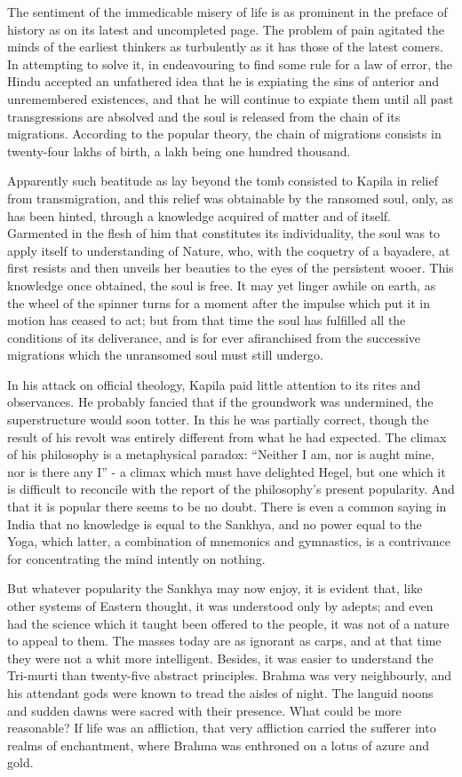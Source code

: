 \documentclass[]{book}
\begin{document}
The sentiment of the immedicable misery of life is as prominent in the
preface of history as on its latest and uncompleted page. The problem of
pain agitated the minds of the earliest thinkers as turbulently as it
has those of the latest comers. In attempting to solve it, in
endeavouring to find some rule for a law of error, the Hindu accepted an
unfathered idea that he is expiating the sins of anterior and
unremembered existences, and that he will continue to expiate them until
all past transgressions are absolved and the soul is released from the
chain of its migrations. According to the popular theory, the chain of
migrations consists in twenty-four lakhs of birth, a lakh being one
hundred thousand.

Apparently such beatitude as lay beyond the tomb consisted to Kapila in
relief from transmigration, and this relief was obtainable by the
ransomed soul, only, as has been hinted, through a knowledge acquired of
matter and of itself. Garmented in the flesh of him that constitutes its
individuality, the soul was to apply itself to understanding of Nature,
who, with the coquetry of a bayadere, at first resists and then unveils
her beauties to the eyes of the persistent wooer. This knowledge once
obtained, the soul is free. It may yet linger awhile on earth, as the
wheel of the spinner turns for a moment after the impulse which put it
in motion has ceased to act; but from that time the soul has fulfilled
all the conditions of its deliverance, and is for ever afiranchised from
the successive migrations which the unransomed soul must still undergo.

In his attack on official theology, Kapila paid little attention to its
rites and observances. He probably fancied that if the groundwork was
undermined, the superstructure would soon totter. In this he was
partially correct, though the result of his revolt was entirely
different from what he had expected. The climax of his philosophy is a
metaphysical paradox: ``Neither I am, nor is aught mine, nor is there
any I'' - a climax which must have delighted Hegel, but one which it is
difficult to reconcile with the report of the philosophy's present
popularity. And that it is popular there seems to be no doubt. There is
even a common saying in India that no knowledge is equal to the Sankhya,
and no power equal to the Yoga, which latter, a combination of mnemonics
and gymnastics, is a contrivance for concentrating the mind intently on
nothing.

But whatever popularity the Sankhya may now enjoy, it is evident that,
like other systems of Eastern thought, it was understood only by adepts;
and even had the science which it taught been offered to the people, it
was not of a nature to appeal to them. The masses today are as ignorant
as carps, and at that time they were not a whit more intelligent.
Besides, it was easier to understand the Tri-murti than twenty-five
abstract principles. Brahma was very neighbourly, and his attendant gods
were known to tread the aisles of night. The languid noons and sudden
dawns were sacred with their presence. What could be more reasonable? If
life was an affliction, that very affliction carried the sufferer into
realms of enchantment, where Brahma was enthroned on a lotus of azure
and gold.
\end{document}
